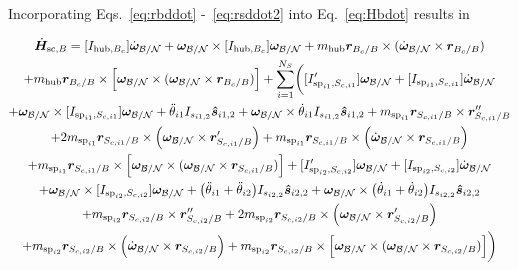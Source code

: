 \documentclass[paper]{aiaaNew}
\begin{document}
	Incorporating Eqs.~\eqref{eq:rbddot} -~\eqref{eq:rsddot2} into Eq.~\eqref{eq:Hbdot} results in

	\begin{multline}
	\dot{\bm{H}}_{\text{sc},B} = [I_{\text{hub},B_c}] \dot{\bm\omega}_{\cal B/N} + \bm\omega_{\cal B/N} \times [I_{\text{hub},B_c}] \bm\omega_{\cal B/N} + m_{\text{hub}} \bm{r}_{B_c/B}\times ( \dot{\bm\omega}_{\cal B/N}\times \bm{r}_{B_c/B}) \\+ m_{\text{hub}} \bm{r}_{B_c/B}\times\Big[\bm\omega_{\cal B/N} \times (\bm\omega_{\cal B/N} \times \bm{r}_{B_c/B})\Big] +\sum\limits_{i=1}^{N_S} \biggl( [I'_{\text{sp}_{i1},S_{c,i1}}] \bm\omega_{\cal B/N} + [I_{\text{sp}_{i1},S_{c,i1}}] \dot{\bm\omega}_{\cal B/N} \\+ \bm\omega_{\cal B/N} \times [I_{\text{sp}_{i1},S_{c,i1}}] \bm\omega_{\cal B/N} 
	+ \ddot{\theta}_{i1} I_{s_{i1,2}}\bm{\hat{s}}_{i1,2}+ \bm\omega_{\cal B/N} \times \dot{\theta}_{i1} I_{s_{i1,2}}\bm{\hat{s}}_{i1,2} 
	+m_{\text{sp}_{i1}} \bm{r}_{S_{c,i1}/B} \times \bm{r}''_{S_{c,i1}/B}\\ + 2 m_{\text{sp}_{i1}} \bm{r}_{S_{c,i1}/B} \times \Big( \bm\omega_{\cal B/N} \times \bm{r}'_{S_{c,i1}/B}\Big)
	+m_{\text{sp}_{i1}} \bm{r}_{S_{c,i1}/B} \times \Big( \dot{\bm\omega}_{\cal B/N} \times \bm{r}_{S_{c,i1}/B}\Big) \\+m_{\text{sp}_{i1}} \bm{r}_{S_{c,i1}/B} \times \Big[ \bm\omega_{\cal B/N} \times (\bm\omega_{\cal B/N} \times \bm{r}_{S_{c,i1}/B})\Big]
	+ [I'_{\text{sp}_{i2},S_{c,i2}}] \bm\omega_{\cal B/N} + [I_{\text{sp}_{i2},S_{c,i2}}] \dot{\bm\omega}_{\cal B/N} \\+ \bm\omega_{\cal B/N} \times [I_{\text{sp}_{i2},S_{c,i2}}] \bm\omega_{\cal B/N} 
	+ \big(\ddot{\theta}_{i1} + \ddot{\theta}_{i2}\big) I_{s_{i2,2}}\bm{\hat{s}}_{i2,2}+ \bm\omega_{\cal B/N} \times \big(\dot{\theta}_{i1} + \dot{\theta}_{i2}\big) I_{s_{i2,2}}\bm{\hat{s}}_{i2,2} \\
	+m_{\text{sp}_{i2}} \bm{r}_{S_{c,i2}/B} \times \bm{r}''_{S_{c,i2}/B} + 2 m_{\text{sp}_{i2}} \bm{r}_{S_{c,i2}/B} \times \Big(\bm\omega_{\cal B/N} \times \bm{r}'_{S_{c,i2}/B}\Big)\\
	 +m_{\text{sp}_{i2}} \bm{r}_{S_{c,i2}/B} \times \Big(\dot{\bm\omega}_{\cal B/N} \times \bm{r}_{S_{c,i2}/B}\Big) +m_{\text{sp}_{i2}} \bm{r}_{S_{c,i2}/B} \times \Big[\bm\omega_{\cal B/N} \times (\bm\omega_{\cal B/N} \times \bm{r}_{S_{c,i2}/B})\Big]\biggr)
	\label{eq:Hbdot3}
\end{multline}	
\end{document}
